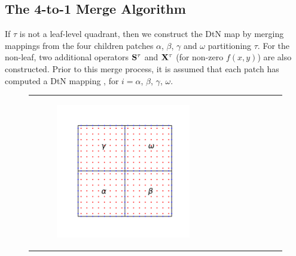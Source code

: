 \subsection{The 4-to-1 Merge Algorithm}
\label{sub:4-to-1merge}
If $\tau$ is not a leaf-level quadrant, then we construct the DtN map  by merging mappings from the four children patches $\alpha$, $\beta$, $\gamma$ and $\omega$  partitioning $\tau$.  For the non-leaf, two additional operators $\mathbf S^{\tau}$ and $\mathbf X^{\tau}$ (for non-zero $f(x,y)$) are also constructed.  Prior to this merge process, it is assumed that each patch has computed a DtN mapping \Ti, for $i=\alpha$, $\beta$, $\gamma$, $\omega$. 

\begin{figure}
    \centering
    \begin{tabular}{ccc}
        \begin{subfigure}[t]{0.3\textwidth}
            \centering
            \includegraphics[width=\textwidth, clip=true, trim={100 150 100 150}]{figures/four_patches.pdf}
            \label{subfig:4_patches_with_grid}
        \end{subfigure}
        &
        \begin{subfigure}[t]{0.3\textwidth}
            \centering

\end{subfigure}
\end{tabular}
\end{figure}
